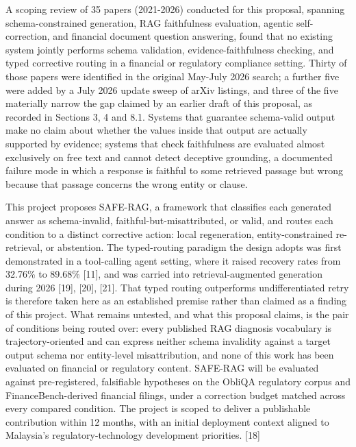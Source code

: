 \documentclass[11pt,a4paper]{article}
\begin{document}
A scoping review of 35 papers (2021-2026) conducted for this proposal, spanning
schema-constrained generation, RAG faithfulness evaluation, agentic self-correction,
and financial document question answering, found that no existing system jointly
performs schema validation, evidence-faithfulness checking, and typed corrective
routing in a financial or regulatory compliance setting. Thirty of those papers were
identified in the original May-July 2026 search; a further five were added by a
July 2026 update sweep of arXiv listings, and three of the five materially narrow the
gap claimed by an earlier draft of this proposal, as recorded in Sections 3, 4 and 8.1.
Systems that guarantee schema-valid output make no claim about whether the values
inside that output are actually supported by evidence; systems that check faithfulness
are evaluated almost exclusively on free text and cannot detect deceptive grounding, a
documented failure mode in which a response is faithful to some retrieved passage but
wrong because that passage concerns the wrong entity or clause.

This project proposes SAFE-RAG, a framework that classifies each generated answer as
schema-invalid, faithful-but-misattributed, or valid, and routes each condition to a
distinct corrective action: local regeneration, entity-constrained re-retrieval, or
abstention. The typed-routing paradigm the design adopts was first demonstrated in a
tool-calling agent setting, where it raised recovery rates from 32.76\% to 89.68\%
[11], and was carried into retrieval-augmented generation during 2026 [19], [20], [21].
That typed routing outperforms undifferentiated retry is therefore taken here as an
established premise rather than claimed as a finding of this project. What remains
untested, and what this proposal claims, is the pair of conditions being routed over:
every published RAG diagnosis vocabulary is trajectory-oriented and can express neither
schema invalidity against a target output schema nor entity-level misattribution, and
none of this work has been evaluated on financial or regulatory content. SAFE-RAG will
be evaluated against pre-registered, falsifiable hypotheses on the ObliQA regulatory
corpus and FinanceBench-derived financial filings, under a correction budget matched
across every compared condition. The project is scoped to deliver a publishable
contribution within 12 months, with an initial deployment context aligned to
Malaysia's regulatory-technology development priorities. [18]

\end{document}
